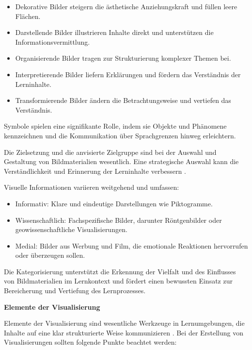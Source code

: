 \begin{itemize}
	\item Dekorative Bilder steigern die ästhetische Anziehungskraft und füllen leere Flächen.
	\item Darstellende Bilder illustrieren Inhalte direkt und unterstützen die Informationsvermittlung.
	\item Organisierende Bilder tragen zur Strukturierung komplexer Themen bei.
	\item Interpretierende Bilder liefern Erklärungen und fördern das Verständnis der Lerninhalte.
	\item Transformierende Bilder ändern die Betrachtungsweise und vertiefen das Verständnis.
\end{itemize}
Symbole spielen eine signifikante Rolle, indem sie Objekte und Phänomene kennzeichnen und die Kommunikation über Sprachgrenzen hinweg erleichtern.

Die Zielsetzung und die anvisierte Zielgruppe sind bei der Auswahl und Gestaltung von Bildmaterialien wesentlich. Eine strategische Auswahl kann die Verständlichkeit und Erinnerung der Lerninhalte verbessern \cite{Bilek2007}.

Visuelle Informationen variieren weitgehend und umfassen:

\begin{itemize}
	\item Informativ: Klare und eindeutige Darstellungen wie Piktogramme.
	\item Wissenschaftlich: Fachspezifische Bilder, darunter Röntgenbilder oder geowissenschaftliche Visualisierungen.
	\item Medial: Bilder aus Werbung und Film, die emotionale Reaktionen hervorrufen oder überzeugen sollen.
\end{itemize}

Die Kategorisierung unterstützt die Erkennung der Vielfalt und des Einflusses von Bildmaterialien im Lernkontext und fördert einen bewussten Einsatz zur Bereicherung und Vertiefung des Lernprozesses.

\textbf{Elemente der Visualisierung}

Elemente der Visualisierung sind wesentliche Werkzeuge in Lernumgebungen, die Inhalte auf eine klar strukturierte Weise kommunizieren \cite{Bilek2007}. Bei der Erstellung von Visualisierungen sollten folgende Punkte beachtet werden:


